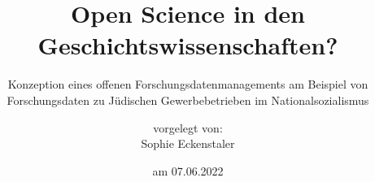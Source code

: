 \titlehead{Humboldt-Universität zu Berlin\\
Philosophische Fakultät\\
Institut für Geschichtswissenschaften\vspace*{4cm}}
\subject{Masterarbeit}
\title{Open Science in den Geschichtswissenschaften?}
\subtitle{Konzeption eines offenen Forschungsdatenmanagements am Beispiel von Forschungsdaten zu Jüdischen Gewerbebetrieben im Nationalsozialismus}
\author{vorgelegt von:\\Sophie Eckenstaler}
\date{am 07.06.2022\vspace*{3.7cm}}
\publishers{\normalsize
Erstbetreuer: Prof. Dr. Rüdiger Hohls, Institut für Geschichtswissenschaften, HU Berlin\\ 
Zweitbetreuer: Prof. Dr. Michael Wildt, Institut für Geschichtswissenschaften, HU Berlin\\
Studiengang: Master of Arts, Geschichtswissenschaften, Schwerpunkt: Digital History\\
Matrikelnr.: 596272\\
E-Mail: sophie.eckenstaler@hu-berlin.de\\
Eberswalde, den 7. Juni 2022
}


